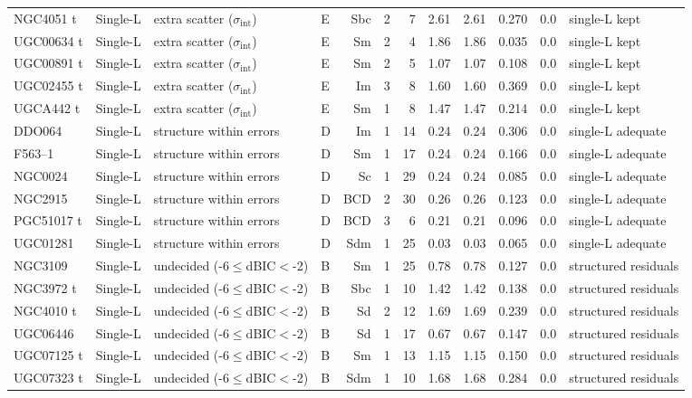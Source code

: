 \documentclass[10pt]{article}
\begin{document}
\begin{landscape}
{\begin{longtable}{llllrrrrrrrl}
NGC4051 t & Single-L & extra scatter ($\sigma_\mathrm{int}$) & E & Sbc & 2 & 7 & 2.61 & 2.61 & 0.270 & 0.0 & single-L kept\\
UGC00634 t & Single-L & extra scatter ($\sigma_\mathrm{int}$) & E & Sm & 2 & 4 & 1.86 & 1.86 & 0.035 & 0.0 & single-L kept\\
UGC00891 t & Single-L & extra scatter ($\sigma_\mathrm{int}$) & E & Sm & 2 & 5 & 1.07 & 1.07 & 0.108 & 0.0 & single-L kept\\
UGC02455 t & Single-L & extra scatter ($\sigma_\mathrm{int}$) & E & Im & 3 & 8 & 1.60 & 1.60 & 0.369 & 0.0 & single-L kept\\
UGCA442 t & Single-L & extra scatter ($\sigma_\mathrm{int}$) & E & Sm & 1 & 8 & 1.47 & 1.47 & 0.214 & 0.0 & single-L kept\\
DDO064 & Single-L & structure within errors & D & Im & 1 & 14 & 0.24 & 0.24 & 0.306 & 0.0 & single-L adequate\\
F563--1 & Single-L & structure within errors & D & Sm & 1 & 17 & 0.24 & 0.24 & 0.166 & 0.0 & single-L adequate\\
NGC0024 & Single-L & structure within errors & D & Sc & 1 & 29 & 0.24 & 0.24 & 0.085 & 0.0 & single-L adequate\\
NGC2915 & Single-L & structure within errors & D & BCD & 2 & 30 & 0.26 & 0.26 & 0.123 & 0.0 & single-L adequate\\
PGC51017 t & Single-L & structure within errors & D & BCD & 3 & 6 & 0.21 & 0.21 & 0.096 & 0.0 & single-L adequate\\
UGC01281 & Single-L & structure within errors & D & Sdm & 1 & 25 & 0.03 & 0.03 & 0.065 & 0.0 & single-L adequate\\
NGC3109 & Single-L & undecided (-6$\le$dBIC$<$-2) & B & Sm & 1 & 25 & 0.78 & 0.78 & 0.127 & 0.0 & structured residuals\\
NGC3972 t & Single-L & undecided (-6$\le$dBIC$<$-2) & B & Sbc & 1 & 10 & 1.42 & 1.42 & 0.138 & 0.0 & structured residuals\\
NGC4010 t & Single-L & undecided (-6$\le$dBIC$<$-2) & B & Sd & 2 & 12 & 1.69 & 1.69 & 0.239 & 0.0 & structured residuals\\
UGC06446 & Single-L & undecided (-6$\le$dBIC$<$-2) & B & Sd & 1 & 17 & 0.67 & 0.67 & 0.147 & 0.0 & structured residuals\\
UGC07125 t & Single-L & undecided (-6$\le$dBIC$<$-2) & B & Sm & 1 & 13 & 1.15 & 1.15 & 0.150 & 0.0 & structured residuals\\
UGC07323 t & Single-L & undecided (-6$\le$dBIC$<$-2) & B & Sdm & 1 & 10 & 1.68 & 1.68 & 0.284 & 0.0 & structured residuals\\

\end{longtable}}
\end{landscape}
\end{document}
